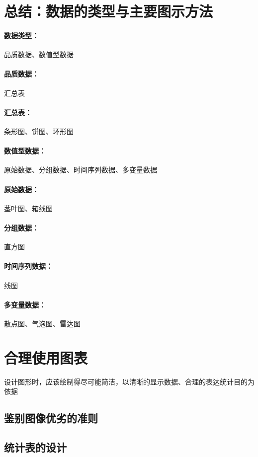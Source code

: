 \documentclass[UTF8,10pt]{book}
\begin{document}
    \section{总结：数据的类型与主要图示方法}
                \paragraph{数据类型：} 品质数据、数值型数据
                \paragraph{品质数据：} 汇总表
                \paragraph{汇总表：} 条形图、饼图、环形图
                \paragraph{数值型数据：} 原始数据、分组数据、时间序列数据、多变量数据
                \paragraph{原始数据：} 茎叶图、箱线图
                \paragraph{分组数据：} 直方图
                \paragraph{时间序列数据：} 线图
                \paragraph{多变量数据：} 散点图、气泡图、雷达图



    \section{合理使用图表}
                设计图形时，应该绘制得尽可能简洁，以清晰的显示数据、合理的表达统计目的为依据
                
    \subsection{鉴别图像优劣的准则}
    \subsection{统计表的设计}
\end{document}
